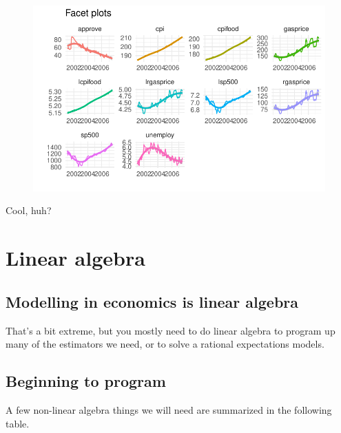 \documentclass[
  letterpaper,
]{book}
\begin{document}
\begin{figure}[H]

{\centering \includegraphics{Appendix1_files/figure-pdf/unnamed-chunk-12-1.pdf}

}

\end{figure}

Cool, huh?

\hypertarget{linear-algebra}{%
\chapter{Linear algebra}\label{linear-algebra}}

\hypertarget{modelling-in-economics-is-linear-algebra}{%
\section{\texorpdfstring{Modelling in economics \textbf{is} linear
algebra}{Modelling in economics is linear algebra}}\label{modelling-in-economics-is-linear-algebra}}

That's a bit extreme, but you mostly need to do linear algebra to
program up many of the estimators we need, or to solve a rational
expectations models.

\hypertarget{beginning-to-program}{%
\section{Beginning to program}\label{beginning-to-program}}

A few non-linear algebra things we will need are summarized in the
following table.
\end{document}
